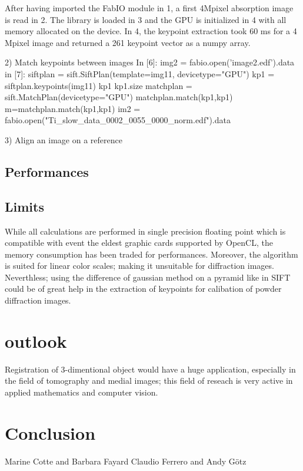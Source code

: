 \documentclass[preprint]{iucr}
\begin{document}
After having imported the FabIO\cite{fabio} module in 1, a first
4Mpixel absorption image is read in 2. The library is loaded in 3 and the GPU is
initialized in 4 with all memory allocated on the device.
In 4, the keypoint extraction took 60 ms for a
4 Mpixel image and returned a 261 keypoint vector as a numpy array.

2) Match keypoints between images
In [6]: img2 = fabio.open('image2.edf').data
in [7]:
siftplan = sift.SiftPlan(template=img11, devicetype="GPU")
kp1 = siftplan.keypoints(img11)
kp1
kp1.size
matchplan = sift.MatchPlan(devicetype="GPU")
matchplan.match(kp1,kp1)
m=matchplan.match(kp1,kp1)
im2 = fabio.open("Ti_slow_data_0002_0055_0000_norm.edf").data

3) Align an image on a reference



\subsection{Performances}

\subsection{Limits}
While all calculations are performed in single precision floating point which is
compatible with event the eldest graphic cards supported by OpenCL, the memory
consumption has been traded for performances. Moreover, the algorithm is suited
for linear color scales; making it unsuitable for diffraction images.
Neverthless; using the difference of gaussian method on a pyramid like in
SIFT could be of great help in the extraction of keypoints for calibation of
powder diffraction images.


\section{outlook}

Registration of 3-dimentional object would have a huge application, especially
in the field of tomography and medial images; this field of reseach is very
active in applied mathematics and computer vision.


\section{Conclusion}


Marine Cotte and Barbara Fayard
Claudio Ferrero and Andy G\"otz



\end{document}
